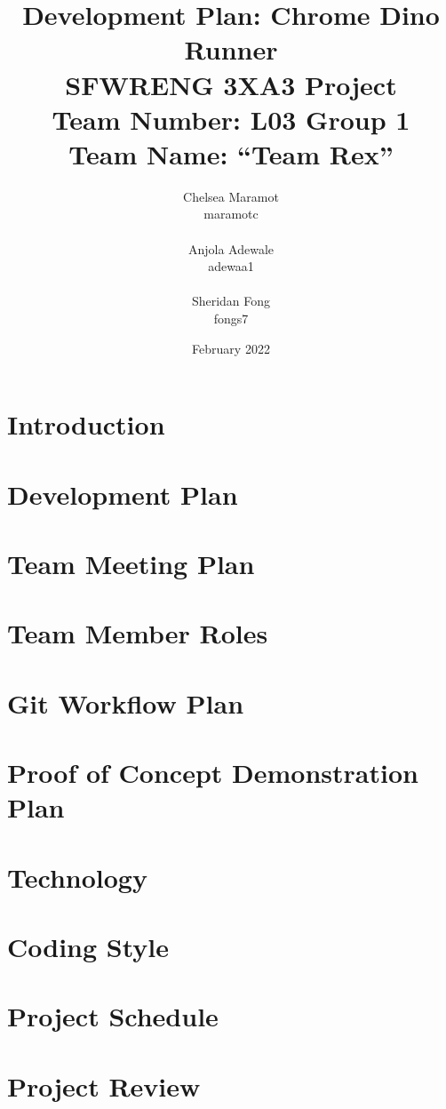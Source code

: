 \documentclass{article}
\title{Development Plan: Chrome Dino Runner \\ \bigskip \large SFWRENG 3XA3 Project \\ \bigskip \large Team Number: L03 Group 1 \\ \large Team Name: ``Team Rex'' }
\author{Chelsea Maramot \\ maramotc \\ \\ Anjola Adewale \\ adewaa1 \\ \\ Sheridan Fong \\ fongs7 }
\date{February 2022}
\begin{document}
	
	\maketitle
	
	\section{Introduction}
	
	\section{Development Plan}
	
	\section{Team Meeting Plan}
	
	\section{Team Member Roles}
	
	\section{Git Workflow Plan}
	
	\section{Proof of Concept Demonstration Plan}
	
	\section{Technology}
	
	\section{Coding Style}
	
	\section{Project Schedule}
	
	\section{Project Review}
	
\end{document}
